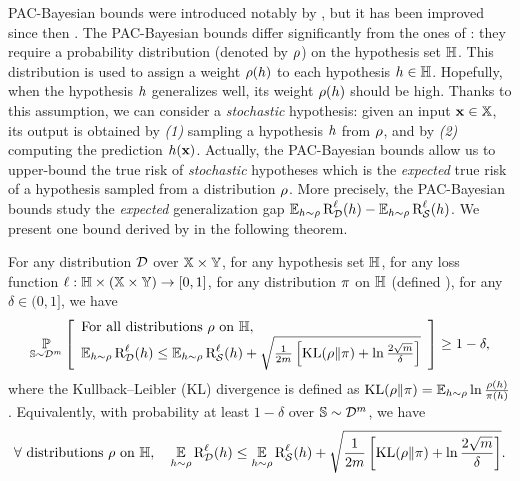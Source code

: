 PAC-Bayesian bounds were introduced notably by \citet{ShaweTaylorWilliamson1997,McAllester1999}, but it has been improved since then \citep{Seeger2002,Maurer2004,Catoni2007}.
The PAC-Bayesian bounds differ significantly from the ones of : they require a probability distribution (denoted by $\Q$) on the hypothesis set $\H$.
This distribution is used to assign a weight $\Q(\h)$ to each hypothesis $\h\in\H$. 
Hopefully, when the hypothesis $\h$ generalizes well, its weight $\Q(\h)$ should be high.
Thanks to this assumption, we can consider a {\it stochastic} hypothesis: given an input $\x\in\X$, its output is obtained by {\it (1)} sampling a hypothesis $\h$ from $\Q$, and by {\it (2)} computing the prediction $\h(\x)$.
Actually, the PAC-Bayesian bounds allow us to upper-bound the true risk of {\it stochastic} hypotheses which is the {\it expected} true risk of a hypothesis sampled from a distribution $\Q$.
More precisely, the PAC-Bayesian bounds study the {\it expected} generalization gap $\EE_{\h\sim\Q}\RiskLoss_{\D}(\h)-\EE_{\h\sim\Q}\RiskLoss_{\dS}(\h)$.
We present one bound derived by \citet{Maurer2004} in the following theorem.

\begin{theorem}
For any distribution $\D$ over $\X\times\Y$, for any hypothesis set $\H$, for any loss function $\loss: \H\times (\X\times\Y) \rightarrow [0, 1]$, for any distribution $\P$ on $\H$ (defined \apriori), for any $\delta\in(0,1]$, we have
\begin{align*}
\PP_{\S\sim\D^\m}\LB
\begin{array}{l}
    \text{For all distributions } \Q \text{ on } \H,\\
    \EE_{h\sim\Q} \RiskLoss_{\D}(\h) \le \EE_{h\sim\Q}\RiskLoss_{\dS}(\h) + \sqrt{\frac{1}{2\m}\LB \KL(\Q\|\P) + \ln\frac{2\sqrt{\m}}{\delta}\RB}
\end{array}
\RB \ge 1-\delta,
\end{align*}
where the Kullback–Leibler (KL) divergence is defined as $\KL(\Q\|\P)=\EE_{\h\sim\Q}\ln\frac{\Q(\h)}{\P(\h)}$.
Equivalently, with probability at least $1-\delta$ over $\S\sim\D^\m$, we have
\begin{align*}
\forall\text{ distributions } \Q \text{ on } \H,\quad \EE_{h\sim\Q}\RiskLoss_{\D}(\h) \le \EE_{h\sim\Q}\RiskLoss_{\dS}(\h) + \sqrt{\frac{1}{2\m}\LB \KL(\Q\|\P) + \ln\frac{2\sqrt{\m}}{\delta}\RB}.
\end{align*}
\label{chap:intro:theorem:maurer}
\end{theorem}

